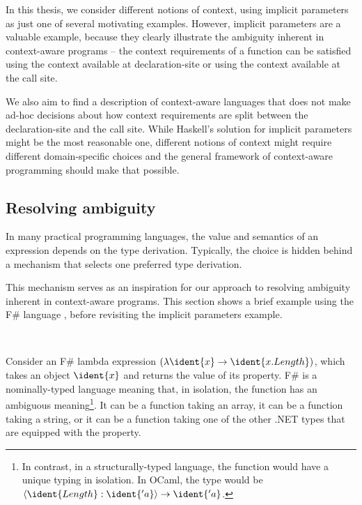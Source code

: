 In this thesis, we consider different notions of context, using implicit parameters as just one
of several motivating examples. However, implicit parameters are a valuable example, because they
clearly illustrate the ambiguity inherent in context-aware programs -- the context requirements of
a function can be satisfied using the context available at declaration-site or using the context
available at the call site.

We also aim to find a description of context-aware languages that does not make ad-hoc decisions
about how context requirements are split between the declaration-site and the call site. While
Haskell's solution for implicit parameters might be the most reasonable one, different notions
of context might require different domain-specific choices and the general framework of
context-aware programming should make that possible.


\subsection{Resolving ambiguity}
\label{sec:path-binding-amb}

In many practical programming languages, the value and semantics of an expression depends on the
type derivation. Typically, the choice is hidden behind a mechanism that selects one preferred type
derivation.

This mechanism serves as an inspiration for our approach to resolving ambiguity inherent in
context-aware programs. This section shows a brief example using the F\# language \cite{app-fsharp},
before revisiting the implicit parameters example.

~

Consider an F\# lambda expression $(\lambda\ident{x}\rightarrow\ident{x.Length})$, which takes
an object $\ident{x}$ and returns the value of its  property. F\# is a nominally-typed
language meaning that, in isolation, the function has an ambiguous meaning\footnote{In contrast,
in a structurally-typed language, the function would have a unique typing in isolation. In OCaml,
the type would be $\langle \ident{Length}:\ident{'a}\rangle \rightarrow \ident{'a}$.}. It can be
a function taking an array, it can be a function taking a string, or it can be a function taking
one of the other .NET types that are equipped with the  property.

